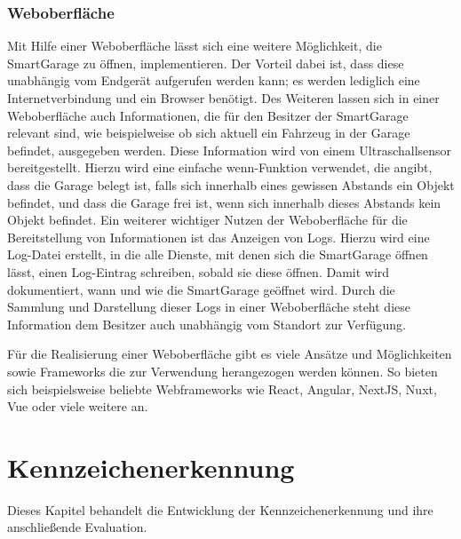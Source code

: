 \subsection{Weboberfläche}
Mit Hilfe einer Weboberfläche lässt sich eine weitere Möglichkeit, die SmartGarage zu öffnen, implementieren. Der Vorteil dabei ist, dass diese unabhängig vom Endgerät aufgerufen werden kann; es werden lediglich eine Internetverbindung und ein Browser benötigt. Des Weiteren lassen sich in einer Weboberfläche auch Informationen, die für den Besitzer der SmartGarage relevant sind, wie beispielweise ob sich aktuell ein Fahrzeug in der Garage befindet, ausgegeben werden. Diese Information wird von einem Ultraschallsensor bereitgestellt. Hierzu wird eine einfache wenn-Funktion verwendet, die angibt, dass die Garage belegt ist, falls sich innerhalb eines gewissen Abstands ein Objekt befindet, und dass die Garage frei ist, wenn sich innerhalb dieses Abstands kein Objekt befindet.
Ein weiterer wichtiger Nutzen der Weboberfläche für die Bereitstellung von Informationen ist das Anzeigen von Logs. Hierzu wird eine Log-Datei erstellt, in die alle Dienste, mit denen sich die SmartGarage öffnen lässt, einen Log-Eintrag schreiben, sobald sie diese öffnen. Damit wird dokumentiert, wann und wie die SmartGarage geöffnet wird. Durch die Sammlung und Darstellung dieser Logs in einer Weboberfläche steht diese Information dem Besitzer auch unabhängig vom Standort zur Verfügung.

Für die Realisierung einer Weboberfläche gibt es viele Ansätze und Möglichkeiten sowie Frameworks die zur Verwendung herangezogen werden können. So bieten sich beispielsweise beliebte Webframeworks wie React, Angular, NextJS, Nuxt, Vue oder viele weitere an. 


\nocite{*}

\chapter{Kennzeichenerkennung}
Dieses Kapitel behandelt die Entwicklung der Kennzeichenerkennung und ihre anschließende Evaluation.

